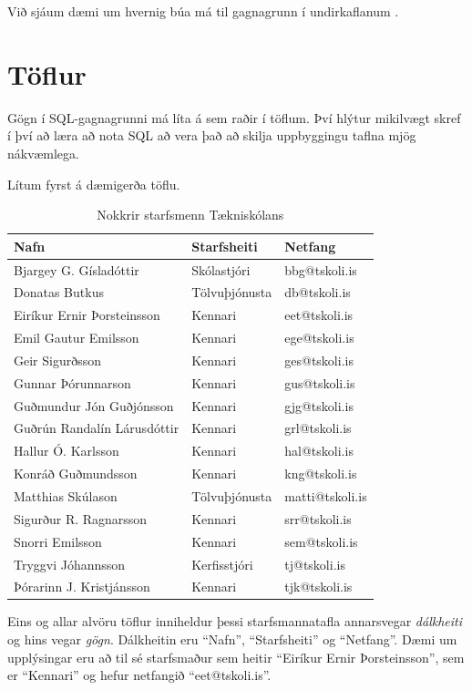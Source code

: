 Við sjáum dæmi um hvernig búa má til gagnagrunn í undirkaflanum .
\section{Töflur}
Gögn í SQL-gagnagrunni má líta á sem raðir í töflum. Því hlýtur mikilvægt skref í því að læra að nota SQL að vera það að skilja uppbyggingu taflna mjög nákvæmlega.

Lítum fyrst á dæmigerða töflu.

\begin{table}
\centering
\caption[Nokkrir starfsmenn Tækniskólans]{Nokkrir starfsmenn Tækniskólans}
\label{tafla:starfsmenn_ts}
\begin{tabular}{lll}
\toprule
Nafn&Starfsheiti&Netfang\\
\midrule
Bjargey G. Gísladóttir&Skólastjóri&bbg@tskoli.is\\
Donatas Butkus&Tölvuþjónusta&db@tskoli.is\\
Eiríkur Ernir Þorsteinsson&Kennari&eet@tskoli.is\\
Emil Gautur Emilsson&Kennari&ege@tskoli.is\\
Geir Sigurðsson&Kennari&ges@tskoli.is\\
Gunnar Þórunnarson&Kennari&gus@tskoli.is\\
Guðmundur Jón Guðjónsson&Kennari&gjg@tskoli.is\\
Guðrún Randalín Lárusdóttir&Kennari&grl@tskoli.is\\
Hallur Ó. Karlsson&Kennari&hal@tskoli.is\\
Konráð Guðmundsson&Kennari&kng@tskoli.is\\
Matthias Skúlason&Tölvuþjónusta&matti@tskoli.is\\
Sigurður R. Ragnarsson&Kennari&srr@tskoli.is\\
Snorri Emilsson&Kennari&sem@tskoli.is\\
Tryggvi Jóhannsson&Kerfisstjóri&tj@tskoli.is\\
Þórarinn J. Kristjánsson&Kennari&tjk@tskoli.is\\
\bottomrule
\end{tabular}
\end{table}
Eins og allar alvöru töflur inniheldur þessi starfsmannatafla annarsvegar \emph{dálkheiti} og hins vegar \emph{gögn}. Dálkheitin eru ``Nafn'', ``Starfsheiti'' og ``Netfang''. Dæmi um upplýsingar eru að til sé starfsmaður sem heitir ``Eiríkur Ernir Þorsteinsson'', sem er ``Kennari'' og hefur netfangið ``eet@tskoli.is''. 

